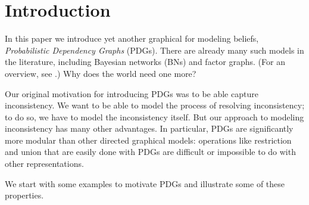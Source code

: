 \documentclass[letterpaper]{article} %
\theoremstyle{plain}
\theoremstyle{definition}
\theoremstyle{remark}
\begin{document}
\section{Introduction}

In this paper we introduce yet another graphical for modeling beliefs,
\emph{Probabilistic Dependency Graphs} (PDGs). There are already many
such models in the literature, including Bayesian networks (BNs) and
factor graphs. (For an overview, see \citeauthor{KF09}.)
Why does the world need one more?  

Our original motivation for introducing PDGs was to be able capture
inconsistency. We want to be able to model the process of resolving
inconsistency; to do so, we have to model the inconsistency itself. But our
approach to modeling inconsistency has many other advantages. In particular,
PDGs are significantly more modular than other directed graphical models:
operations like restriction and union that are easily done with PDGs are
difficult or impossible to do with other representations.

We start with some examples to motivate PDGs and illustrate some of these properties.  
\end{document}
